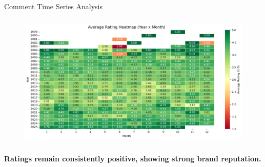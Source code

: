 \begin{frame}{Comment Time Series Analysis}
	
	\vspace{-5pt}
	\begin{figure}
		\centering
			\includegraphics[height=6.5cm]{pic/ts_3.png}
	\end{figure}

    \vspace{-5pt}
    \begin{center}
        \textbf{Ratings remain consistently positive, showing strong brand reputation.}
    \end{center}
    
\end{frame}